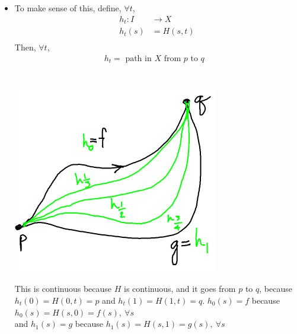     \begin{itemize}
        \item
            To make sense of this, define, $\forall t$,
            \begin{align*}
                h_t: I&\rightarrow X\\
                h_t(s)&=H(s,t)\\
            \end{align*}
            Then, $\forall t$,
            \begin{align*}
                h_t= \text{ path in $X$ from $p$ to $q$ }\\
            \end{align*}\\
            \begin{minipage}[c]{\linewidth}
                \begin{center}
                \includegraphics[]{images/homotopy_class.png}
                \end{center}
            \end{minipage}
            This is continuous because $H$ is continuous, and it goes from $p$ to $q$, because $h_t(0)=H(0,t)=p$ and $h_t(1)=H(1,t)=q$.
            $h_0(s)=f$ because $h_0(s)=H(s,0)=f(s),\ \forall s$\\
            and $h_1(s)=g$ because $h_1(s)=H(s,1)=g(s),\ \forall s$\\
    \end{itemize}

